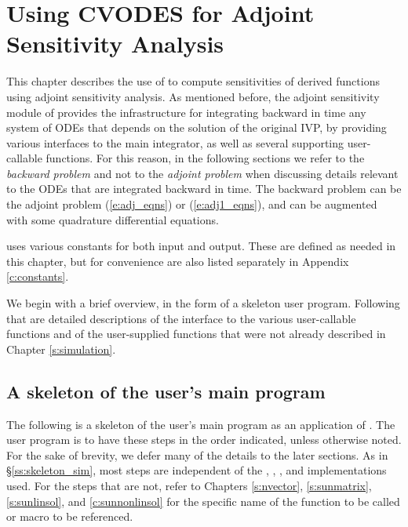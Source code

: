 \chapter{Using CVODES for Adjoint Sensitivity Analysis}\label{s:adjoint}

This chapter describes the use of {\cvodes} to compute sensitivities of derived
functions using adjoint sensitivity analysis. As mentioned before, the adjoint
sensitivity module of {\cvodes} provides the infrastructure for integrating
backward in time any system of ODEs that depends on the solution of the original
IVP, by providing various interfaces to the main {\cvodes} integrator, as well
as several supporting user-callable functions. For this reason, in the following
sections we refer to the {\em backward problem} and not to the
{\em adjoint problem} when discussing details relevant to the ODEs that
are integrated backward in  time. The backward problem can be the adjoint problem
(\ref{e:adj_eqns}) or (\ref{e:adj1_eqns}), and
can be augmented with some quadrature differential equations.

{\cvodes} uses various constants for both input and output.  These are
defined as needed in this chapter, but for convenience are also listed
separately in Appendix \ref{c:constants}.

We begin with a brief overview, in the form of a skeleton user program.
Following that are detailed descriptions of the interface to the
various user-callable functions and of the user-supplied functions that were not
already described in Chapter \ref{s:simulation}.

\section{A skeleton of the user's main program}
\label{ss:skeleton_adj}

The following is a skeleton of the user's main program as an application of
{\cvodes}. The user program is to have these steps in the order indicated,
unless otherwise noted. For the sake of brevity, we defer many of the details
to the later sections.
As in \S\ref{ss:skeleton_sim}, most steps are independent of
the {\nvector}, {\sunmatrix}, {\sunlinsol}, and {\sunnonlinsol}
implementations used. For the steps that are not, refer to Chapters
\ref{s:nvector}, \ref{s:sunmatrix}, \ref{s:sunlinsol}, and \ref{c:sunnonlinsol}
for the specific name of the function to be called or macro to be referenced.


